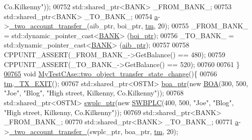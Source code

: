 \begin{DoxyCode}
{       Co.Kilkenny"}));
00752     std::shared\_ptr<BANK> \_FROM\_BANK\_;
00753     std::shared\_ptr<BANK> \_TO\_BANK\_;
00754     \hyperlink{class_my_test_c_ase_a08f3a55850ffce171406f81f2f6c9c74_a08f3a55850ffce171406f81f2f6c9c74}{a}->\hyperlink{classclient_a71edd1265ba9ae03f71b5dbf54548696_a71edd1265ba9ae03f71b5dbf54548696}{\_two\_account\_transfer\_}(aib\_ptr, boi\_ptr, \hyperlink{class_my_test_c_ase_a422e6e5d4ddedea384be96031c89b72b_a422e6e5d4ddedea384be96031c89b72b}{tm}, 20);
00755     \_FROM\_BANK\_ = std::dynamic\_pointer\_cast<\hyperlink{class_b_a_n_k}{BANK}> (\hyperlink{class_my_test_c_ase_a5554de9e3e6393a89c66c036c529720b_a5554de9e3e6393a89c66c036c529720b}{boi\_ptr});
00756     \_TO\_BANK\_ = std::dynamic\_pointer\_cast<\hyperlink{class_b_a_n_k}{BANK}> (\hyperlink{class_my_test_c_ase_adad50e8278b64aa0321000b528e5362c_adad50e8278b64aa0321000b528e5362c}{aib\_ptr});
00757     
00758     CPPUNIT\_ASSERT(\_FROM\_BANK\_->GetBalance() == 480);
00759     CPPUNIT\_ASSERT(\_TO\_BANK\_->GetBalance() == 520);
00760     
00761 \}
\hypertarget{_my_test_c_ase_8cpp_source.tex_l00765}{}\hyperlink{class_my_test_c_ase_ab9c76eb2dfd565a353ae9a5f604b36d9_ab9c76eb2dfd565a353ae9a5f604b36d9}{00765} \textcolor{keywordtype}{void} \hyperlink{class_my_test_c_ase_ab9c76eb2dfd565a353ae9a5f604b36d9_ab9c76eb2dfd565a353ae9a5f604b36d9}{MyTestCAse::two\_object\_transfer\_state\_change}()\{
00766     \hyperlink{class_my_test_c_ase_a422e6e5d4ddedea384be96031c89b72b_a422e6e5d4ddedea384be96031c89b72b}{tm}.\hyperlink{class_t_m_a5e2d1127f2429f2f524d25f430eade06_a5e2d1127f2429f2f524d25f430eade06}{\_TX\_EXIT}();
00767     std::shared\_ptr<OSTM> \hyperlink{class_my_test_c_ase_ae0b2db5d35e25b3139beeda0705494f0_ae0b2db5d35e25b3139beeda0705494f0}{boa\_ptr}(\textcolor{keyword}{new} \hyperlink{class_b_o_a}{BOA}(300, 500, \textcolor{stringliteral}{"Joe"}, \textcolor{stringliteral}{"Blog"}, \textcolor{stringliteral}{"High street, Kilkenny,
       Co.Kilkenny"}));
00768     std::shared\_ptr<OSTM> \hyperlink{class_my_test_c_ase_aa8ccae9a5a7feb5bc47591c55a82d0cd_aa8ccae9a5a7feb5bc47591c55a82d0cd}{swplc\_ptr}(\textcolor{keyword}{new} \hyperlink{class_s_w_b_p_l_c}{SWBPLC}(400, 500, \textcolor{stringliteral}{"Joe"}, \textcolor{stringliteral}{"Blog"}, \textcolor{stringliteral}{"High street,
       Kilkenny, Co.Kilkenny"}));
00769     std::shared\_ptr<BANK> \_FROM\_BANK\_;
00770     std::shared\_ptr<BANK> \_TO\_BANK\_;
00771     \hyperlink{class_my_test_c_ase_a08f3a55850ffce171406f81f2f6c9c74_a08f3a55850ffce171406f81f2f6c9c74}{a}->\hyperlink{classclient_a71edd1265ba9ae03f71b5dbf54548696_a71edd1265ba9ae03f71b5dbf54548696}{\_two\_account\_transfer\_}(swplc\_ptr, boa\_ptr, \hyperlink{class_my_test_c_ase_a422e6e5d4ddedea384be96031c89b72b_a422e6e5d4ddedea384be96031c89b72b}{tm}, 20);

\end{DoxyCode}
